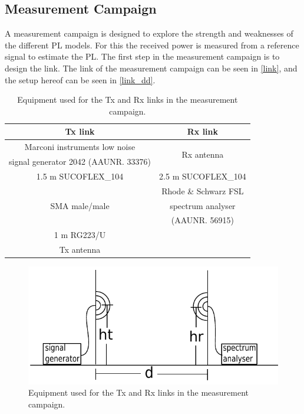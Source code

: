 
\subsection{Measurement Campaign}


A measurement campaign is designed to explore the strength and weaknesses of the different PL models. For this the received power is measured from a reference signal to estimate the PL. The first step in the measurement campaign is to design the link. The link of the measurement campaign can be seen in \autoref{link}, and the setup hereof can be seen in \autoref{link_dd}. 

\begin{table}[!htbp]
\centering
\caption{Equipment used for the Tx and Rx links in the measurement campaign.}
\begin{tabular}{|c|c|}\hline
\textbf{Tx link}&\textbf{Rx link}\\\hline
Marconi instruments low noise & \multirow{2}{*}{Rx antenna} \\
signal generator 2042 (AAUNR. 33376) & \\\hline
1.5 m SUCOFLEX\_104 & 2.5 m SUCOFLEX\_104 \\\hline 
\multirow{3}{*}{SMA male/male} & Rhode \& Schwarz FSL \\
&spectrum analyser \\
& (AAUNR. 56915)\\\hline
1 m RG223/U & \\\hline
Tx antenna &\\\hline
\end{tabular}
\label{link}
\vspace{-2em}
\end{table}
\begin{figure}[!htbp]
\centering 
\includegraphics[scale=0.6]{figures/setup.pdf} 
\caption{Equipment used for the Tx and Rx links in the measurement campaign.}
\label{link_dd}
\end{figure}



